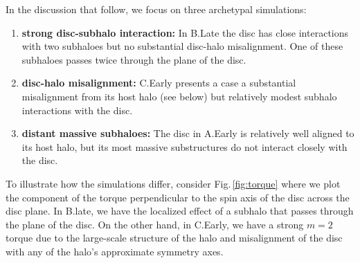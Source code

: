 In the discussion that follow, we focus on three archetypal
simulations:
\begin{enumerate}
\item \textbf{strong disc-subhalo interaction:} In B.Late the disc has close
  interactions with two subhaloes but no substantial disc-halo
  misalignment. One of these subhaloes passes twice through the plane
  of the disc.
\item \textbf{disc-halo misalignment:} C.Early presents a case a
  substantial misalignment from its host halo (see below) but
  relatively modest subhalo interactions with the disc.
\item \textbf{distant massive subhaloes:} The disc in A.Early is relatively
  well aligned to its host halo, but its most massive substructures do not
  interact closely with the disc.
\end{enumerate}

To illustrate how the simulations differ, consider
Fig.\,\ref{fig:torque} where we plot the component of the torque
perpendicular to the spin axis of the disc across the disc plane. In
B.late, we have the localized effect of a subhalo that passes through
the plane of the disc. On the other hand, in C.Early, we have a strong
$m=2$ torque due to the large-scale structure of the halo and
misalignment of the disc with any of the halo's approximate symmetry
axes.

